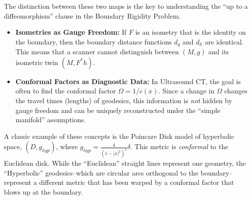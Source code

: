 The distinction between these two maps is the key to understanding the ``up to a diffeomorphism'' clause in the Boundary Rigidity Problem.

\begin{itemize}
  \item \textbf{Isometries as Gauge Freedom:} If $F$ is an isometry that is the identity on the boundary, then the boundary distance functions $d_g$ and $d_h$ are identical. This means that a scanner cannot distinguish between $(M, g)$ and its isometric twin $(M, F^*h)$.
  \item \textbf{Conformal Factors as Diagnostic Data:} In Ultrasound CT, the goal is often to find the conformal factor $\Omega = 1/c(x)$. Since a change in $\Omega$ changes the travel times (lengths) of geodesics, this information is \emph{not} hidden by gauge freedom and can be uniquely reconstructed under the ``simple manifold'' assumptions.
\end{itemize}

\begin{example}
  A classic example of these concepts is the Poincare Disk model of hyperbolic space, $(D, g_{hyp})$, where $g_{hyp} = \frac{4}{(1-|x|^2)^2} \delta$. This metric is \emph{conformal} to the Euclidean disk. While the ``Euclidean'' straight lines represent one geometry, the ``Hyperbolic'' geodesics--which are circular arcs orthogonal to the boundary--represent a different metric that has been warped by a conformal factor that blows up at the boundary.
\end{example}
